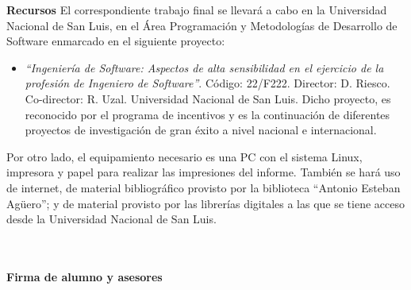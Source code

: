 \documentclass[a4paper,12pt]{article}
\begin{document}
\pagebreak

{\Large \textbf{Recursos}}
\vskip0.5cm
\hspace{0.5cm}El correspondiente trabajo final se llevará a cabo en la Universidad Nacional de San Luis, en el Área Programación y Metodologías de Desarrollo de Software enmarcado en el siguiente proyecto:

\begin{itemize}
\renewcommand{\labelitemi}{$\diamondsuit$}%

\item \textit{“Ingeniería de Software: Aspectos de alta sensibilidad en el ejercicio de la profesión de Ingeniero de Software”}. Código: 22/F222. Director: D. Riesco. Co-director: R. Uzal. Universidad 
Nacional de San Luis. 
Dicho proyecto, es reconocido por el programa de incentivos y es la continuación de 
diferentes proyectos de investigación de gran éxito a nivel nacional e internacional.
 

\end{itemize}


\hspace{0.5cm}Por otro lado, el equipamiento necesario es una PC con el sistema Linux, impresora y papel para realizar las impresiones del informe. También se hará uso de internet, de material bibliográfico provisto por la biblioteca “Antonio Esteban Agüero”; y  de material provisto por las librerías digitales a las que se tiene acceso desde la Universidad Nacional de San Luis.



\renewcommand{\refname}{\Large \textbf{Bibliografía}}

\setlength{\bibsep}{1.5pt}%




\nocite{*}%

{\Large \textbf{\\\\Firma de alumno y asesores}}
\end{document}

